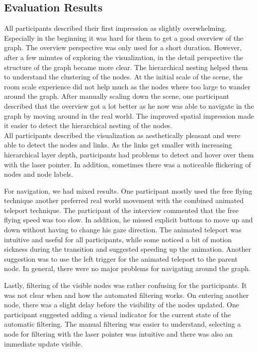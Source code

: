 \subsection{Evaluation Results}

All participants described their first impression as slightly overwhelming.
Especially in the beginning it was hard for them to get a good overview of the graph. The overview perspective was only used for a short duration.
However, after a few minutes of exploring the visualization, in the detail perspective the structure of the graph became more clear.
The hierarchical nesting helped them to understand the clustering of the nodes.
At the initial scale of the scene, the room scale experience did not help much as the nodes where too large to wander around the graph. 
After manually scaling down the scene, one participant described that the overview got a lot better as he now was able to navigate in the graph by moving around in the real world. 
The improved spatial impression made it easier to detect the hierarchical nesting of the nodes.
\\
All participants described the visualization as aesthetically pleasant and were able to detect the nodes and links. As the links get smaller with increasing hierarchical layer depth, participants had problems to detect and hover over them with the laser pointer.
In addition, sometimes there was a noticeable flickering of nodes and node labels.  

For navigation, we had mixed results. One participant mostly used the free flying technique another preferred real world movement with the combined animated teleport technique.
The participant of the interview commented that the free flying speed was too slow. In addition, he missed explicit buttons to move up and down without having to change his gaze direction.
The animated teleport was intuitive and useful for all participants, while some noticed a bit of motion sickness during the transition and suggested speeding up the animation. Another suggestion was to use the left trigger for the animated teleport to the parent node.   
In general, there were no major problems for navigating around the graph. 

Lastly, filtering of the visible nodes was rather confusing for the participants. It was not clear when and how the automated filtering works. On entering another node, there was a slight delay before the visibility of the nodes updated.
One participant suggested adding a visual indicator for the current state of the automatic filtering.
The manual filtering was easier to understand, selecting a node for filtering with the laser pointer was intuitive and there was also an immediate update visible.


